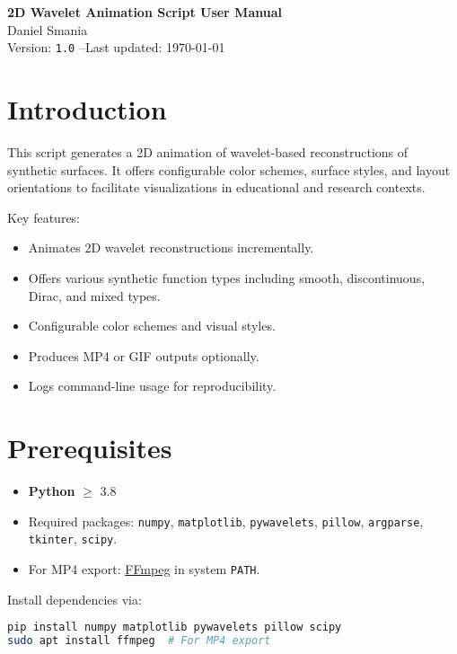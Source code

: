 \documentclass[12pt]{article}
\begin{document}
\begin{center}
{\LARGE\bfseries 2D Wavelet Animation Script User Manual}\\[0.5em]
{\large Daniel Smania} \\[0.5em]
Version: \texttt{1.0} \quad--\quad Last updated: \today
\end{center}

\vspace{1em}

\tableofcontents
\newpage

\section{Introduction}
This script generates a 2D animation of wavelet-based reconstructions of synthetic surfaces. It offers configurable color schemes, surface styles, and layout orientations to facilitate visualizations in educational and research contexts.

Key features:
\begin{itemize}[nosep]
  \item Animates 2D wavelet reconstructions incrementally.
  \item Offers various synthetic function types including smooth, discontinuous, Dirac, and mixed types.
  \item Configurable color schemes and visual styles.
  \item Produces MP4 or GIF outputs optionally.
  \item Logs command-line usage for reproducibility.
\end{itemize}

\section{Prerequisites}
\begin{itemize}[nosep]
  \item \textbf{Python} $\ge$ 3.8
  \item Required packages: \texttt{numpy}, \texttt{matplotlib}, \texttt{pywavelets}, \texttt{pillow}, \texttt{argparse}, \texttt{tkinter}, \texttt{scipy}.
  \item For MP4 export: \href{https://ffmpeg.org/}{FFmpeg} in system \texttt{PATH}.
\end{itemize}

Install dependencies via:
\begin{lstlisting}[language=bash]
pip install numpy matplotlib pywavelets pillow scipy
sudo apt install ffmpeg  # For MP4 export
\end{lstlisting}
\end{document}
